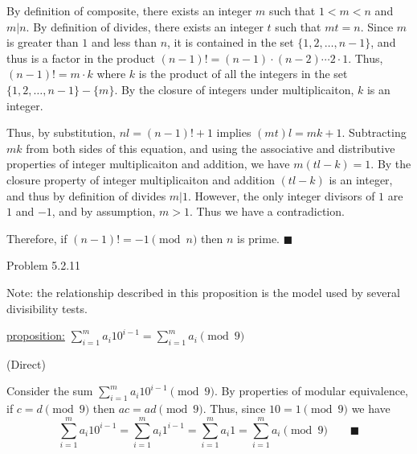 \documentclass{article}
\theoremstyle{definition}
\begin{document}
	By definition of composite, there exists an integer $m$ such that $1<m<n$ and $m|n.$  By definition of divides, there exists an integer $t$ such that $mt=n.$  Since $m$ is greater than $1$ and less than $n$, it is contained in the set $\{1,2,\ldots,n-1\}$, and thus is a factor in the product $(n-1)!=(n-1)\cdot(n-2)\cdots2\cdot 1$. Thus, $(n-1)!=m\cdot k$ where $k$ is the product of all the integers in the set $\{1,2,\ldots,n-1\}-\{m\}$. By the closure of integers under multiplicaiton, $k$ is an integer.

	Thus, by substitution, $nl=(n-1)!+1$ implies $(mt)l=mk+1$. Subtracting $mk$ from both sides of this equation, and using the associative and distributive properties of integer multiplicaiton and addition, we have $m(tl-k)=1$. By the closure property of integer multiplicaiton and addition $(tl-k)$ is an integer, and thus by definition of divides $m|1$. However, the only integer divisors of $1$ are $1$ and $-1$, and by assumption, $m>1$. Thus we have a contradiction.

	Therefore, if $(n-1)!=-1\pmod{n}$ then $n$ is prime. $\blacksquare$


	\vspace{1cm}




	\noindent Problem 5.2.11 \vspace{0.3cm}

	Note: the relationship described in this proposition is the model used by several divisibility tests.

	\vspace{.2cm}

	\underline{proposition:} $\sum_{i=1}^ma_i10^{i-1}=\sum_{i=1}^ma_i\pmod{9}$

	\vspace{.2cm}

	(Direct) \vspace{.15cm}

	Consider the sum $\sum_{i=1}^ma_i10^{i-1}\pmod{9}$. By properties of modular equivalence, if $c=d\pmod{9}$ then $ac=ad\pmod{9}$. Thus, since $10=1\pmod{9}$ we have $$\sum_{i=1}^ma_i10^{i-1}=\sum_{i=1}^ma_i1^{i-1}=\sum_{i=1}^ma_i1=\sum_{i=1}^ma_i\pmod{9} \qquad \blacksquare$$



	\vspace{1cm}


\end{document}
